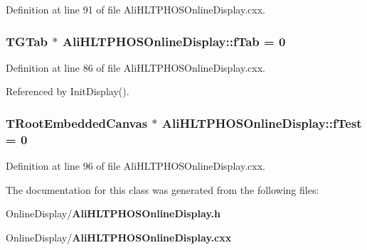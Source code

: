 Definition at line 91 of file Ali\-HLTPHOSOnline\-Display.cxx.
\subsubsection{\setlength{\rightskip}{0pt plus 5cm}TGTab $\ast$ {\bf Ali\-HLTPHOSOnline\-Display::f\-Tab} = 0\hspace{0.3cm}{\tt  [static, private]}}\label{classAliHLTPHOSOnlineDisplay_v14}




Definition at line 86 of file Ali\-HLTPHOSOnline\-Display.cxx.

Referenced by Init\-Display().
\subsubsection{\setlength{\rightskip}{0pt plus 5cm}TRoot\-Embedded\-Canvas $\ast$ {\bf Ali\-HLTPHOSOnline\-Display::f\-Test} = 0\hspace{0.3cm}{\tt  [static, private]}}\label{classAliHLTPHOSOnlineDisplay_v21}




Definition at line 96 of file Ali\-HLTPHOSOnline\-Display.cxx.

The documentation for this class was generated from the following files:\begin{CompactItemize}
\item 
Online\-Display/{\bf Ali\-HLTPHOSOnline\-Display.h}\item 
Online\-Display/{\bf Ali\-HLTPHOSOnline\-Display.cxx}\end{CompactItemize}
